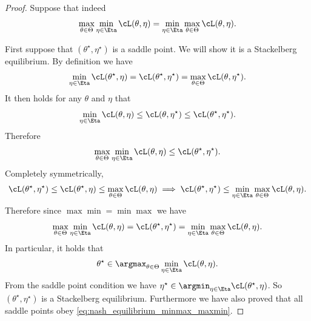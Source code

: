 \documentclass[../../book-main.tex]{subfiles}
\begin{document}
\begin{proof} %
    Suppose that indeed
    \begin{equation}
        \max_{\theta \in \Theta}\min_{\eta \in \Eta}\cL(\theta, \eta)
        = \min_{\eta \in \Eta}\max_{\theta  \in \Theta}\cL(\theta, \eta).
    \end{equation}

    First suppose that \((\theta^{\star}, \eta^{\star})\) is a saddle
    point. We will show it is a Stackelberg equilibrium. By definition we have
    \begin{equation}
        \min_{\eta \in \Eta}\cL(\theta^{\star}, \eta) =
        \cL(\theta^{\star}, \eta^{\star}) = \max_{\theta \in
        \Theta}\cL(\theta, \eta^{\star}).
    \end{equation}
    It then holds for any \(\theta\) and \(\eta\) that
    \begin{equation}
        \min_{\eta \in \Eta}\cL(\theta, \eta) \leq \cL(\theta,
        \eta^{\star}) \leq \cL(\theta^{\star}, \eta^{\star}).
    \end{equation}
    Therefore
    \begin{equation}
        \max_{\theta \in \Theta}\min_{\eta \in \Eta}\cL(\theta, \eta) \leq
        \cL(\theta^{\star}, \eta^{\star}).
    \end{equation}
    Completely symmetrically,
    \begin{equation}
        \cL(\theta^{\star}, \eta^{\star}) \leq \cL(\theta^{\star},
        \eta) \leq \max_{\theta \in \Theta}\cL(\theta, \eta)
        \implies \cL(\theta^{\star}, \eta^{\star}) \leq \min_{\eta
        \in \Eta}\max_{\theta \in \Theta}\cL(\theta, \eta).
    \end{equation}
    Therefore since \(\max\min = \min\max\) we have
    \begin{equation}\label{eq:nash_equilibrium_minmax_maxmin}
        \max_{\theta \in \Theta}\min_{\eta \in \Eta}\cL(\theta, \eta)
        = \cL(\theta^{\star}, \eta^{\star}) = \min_{\eta \in
        \Eta}\max_{\theta \in \Theta}\cL(\theta, \eta).
    \end{equation}
    In particular, it holds that
    \begin{equation}
        \theta^{\star} \in \argmax_{\theta \in \Theta}\min_{\eta \in
        \Eta}\cL(\theta, \eta).
    \end{equation}
    From the saddle point condition we have \(\eta^{\star} \in
    \argmin_{\eta \in \Eta}\cL(\theta^{\star}, \eta)\). So
    \((\theta^{\star}, \eta^{\star})\) is a Stackelberg equilibrium.
    Furthermore we have also proved that all saddle points obey
    \eqref{eq:nash_equilibrium_minmax_maxmin}.


\end{proof}
\end{document}
